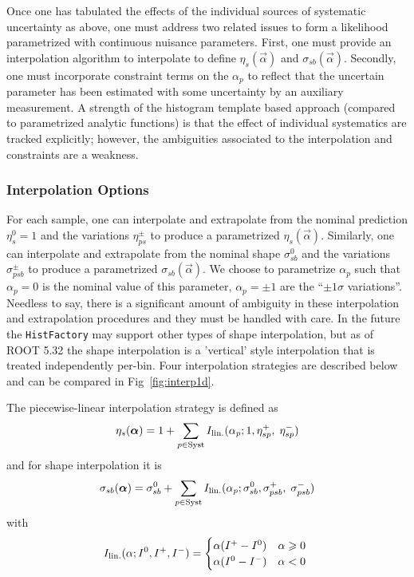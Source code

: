 Once one has tabulated the effects of the individual sources of systematic uncertainty as above, one must address two related issues to form a likelihood parametrized with continuous nuisance parameters.  
First, one must provide an interpolation algorithm to interpolate to define $\eta_{s}(\vec{\alpha})$ and $\sigma_{sb}(\vec{\alpha})$.  Secondly, one must incorporate constraint terms on the $\alpha_p$ to reflect that the uncertain parameter has been estimated with some uncertainty by an auxiliary measurement.  A strength of the histogram template based approach (compared to parametrized analytic functions) is that the effect of individual systematics are tracked explicitly; however, the ambiguities associated to the interpolation and constraints are a weakness.

\subsubsection{Interpolation Options}
\label{S:Interpolation}


For each sample, one can interpolate and extrapolate from the nominal prediction $\eta_s^0=1$ and the variations $\eta^\pm_{ps}$ to produce a parametrized $\eta_s(\vec{\alpha})$.   Similarly, one can interpolate and extrapolate from the nominal shape $\sigma_{sb}^0$ and the variations $\sigma^\pm_{psb}$ to produce a parametrized $\sigma_{sb}(\vec{\alpha})$.  We choose to parametrize $\alpha_p$ such that $\alpha_p=0$ is the nominal value of this parameter, $\alpha_p=\pm 1$ are the ``$\pm 1\sigma$ variations''.  Needless to say, there is a significant amount of ambiguity in these interpolation and extrapolation procedures and they must be handled with care.  In the future the \texttt{HistFactory} may support other types of shape interpolation, but as of ROOT 5.32 the shape interpolation is a 'vertical' style interpolation that is treated independently per-bin. Four interpolation strategies are described below and can be compared in Fig~\ref{fig:interp1d}.  

The piecewise-linear interpolation strategy is defined as
\begin{equation}
\eta_s ({\boldsymbol \alpha}) = 1+\sum_{p\in\textrm{Syst}} I_{\rm lin.}(\alpha_p; 1, \eta_{sp}^+, \; \eta_{sp}^- ) 
\end{equation}
and for shape interpolation it is
\begin{equation}
\sigma_{sb} ({\boldsymbol \alpha}) = \sigma_{sb}^0 + \sum_{p\in\textrm{Syst}} I_{\rm lin.}(\alpha_p;  \sigma_{sb}^0, \sigma_{psb}^+ ,\;
\sigma_{psb}^- )  
\end{equation}
with
\begin{equation}
 I_{\rm lin.}(\alpha;  I^0, I^+,I^- ) =
 \begin{cases}
     \alpha (I^+  -  I^0) &  \text{$\alpha\ge 0$} \\
     \alpha (I^0  -I^-)  &  \text{$\alpha<0$ }
 \end{cases}
\end{equation}

